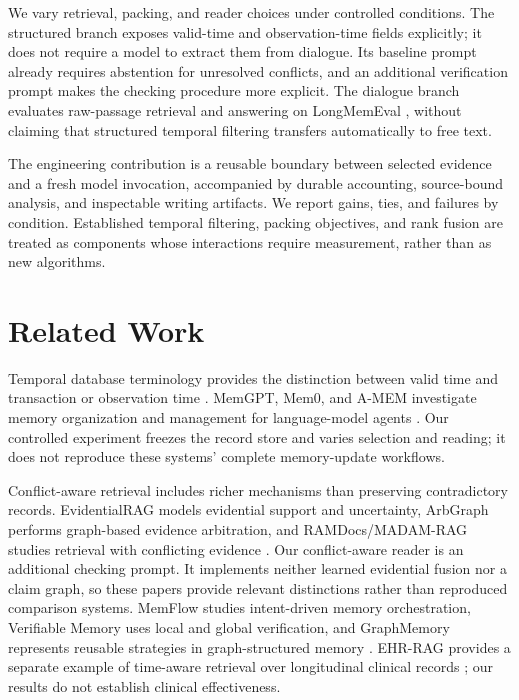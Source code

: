 \documentclass{article}
\begin{document}
We vary retrieval, packing, and reader choices under controlled conditions. The structured branch exposes valid-time and observation-time fields explicitly; it does not require a model to extract them from dialogue. Its baseline prompt already requires abstention for unresolved conflicts, and an additional verification prompt makes the checking procedure more explicit. The dialogue branch evaluates raw-passage retrieval and answering on LongMemEval \citep{longmemeval}, without claiming that structured temporal filtering transfers automatically to free text.

The engineering contribution is a reusable boundary between selected evidence and a fresh model invocation, accompanied by durable accounting, source-bound analysis, and inspectable writing artifacts. We report gains, ties, and failures by condition. Established temporal filtering, packing objectives, and rank fusion are treated as components whose interactions require measurement, rather than as new algorithms.
\section{Related Work}
Temporal database terminology provides the distinction between valid time and transaction or observation time \citep{temporal}. MemGPT, Mem0, and A-MEM investigate memory organization and management for language-model agents \citep{memgpt,memzero,amem}. Our controlled experiment freezes the record store and varies selection and reading; it does not reproduce these systems' complete memory-update workflows.

Conflict-aware retrieval includes richer mechanisms than preserving contradictory records. EvidentialRAG models evidential support and uncertainty, ArbGraph performs graph-based evidence arbitration, and RAMDocs/MADAM-RAG studies retrieval with conflicting evidence \citep{evidentialrag,arbgraph,ramdocs}. Our conflict-aware reader is an additional checking prompt. It implements neither learned evidential fusion nor a claim graph, so these papers provide relevant distinctions rather than reproduced comparison systems. MemFlow studies intent-driven memory orchestration, Verifiable Memory uses local and global verification, and GraphMemory represents reusable strategies in graph-structured memory \citep{memflow,verifiablememory,graphmemory}. EHR-RAG provides a separate example of time-aware retrieval over longitudinal clinical records \citep{ehrrag}; our results do not establish clinical effectiveness.
\end{document}
